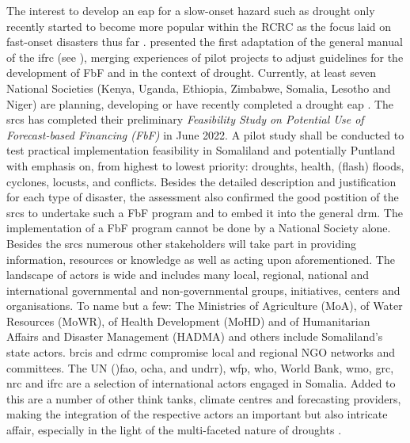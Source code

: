 The interest to develop an \acrshort{eap} for a slow-onset hazard such as drought only recently started to become more popular within the RCRC as the focus laid on fast-onset disasters thus far \autocite{rcrcFORECASTBASEDFINANCINGEARLY2020}. \autocite{rcrcFORECASTBASEDFINANCINGEARLY2020} presented the first adaptation of the general manual of the \acrshort{ifrc} (see \autocite{ifrcFbFPractitionersManual2023b}), merging experiences of pilot projects to adjust guidelines for the development of FbF and  in the context of drought. Currently, at least seven National Societies (Kenya, Uganda, Ethiopia, Zimbabwe, Somalia, Lesotho and Niger) are planning, developing or have recently completed a drought \acrshort{eap} \autocite{lesothoredcrosssocietyEARLYACTIONPROTOCOL2022,nigerredcrosssocietyNigerDroughtEarly2021,rcrcFORECASTBASEDFINANCINGEARLY2020}.\newline
The \acrfull{srcs} has completed their preliminary \textit{Feasibility Study on Potential Use of Forecast-based Financing (FbF)} in June 2022. A pilot study shall be conducted to test practical implementation feasibility in Somaliland and potentially Puntland with emphasis on, from highest to lowest priority: droughts, health, (flash) floods, cyclones, locusts, and conflicts. Besides the detailed description and justification for each type of disaster, the assessment also confirmed the good postition of the \acrshort{srcs} to undertake such a FbF program and to embed it into the general \acrlong{drm}.\newline
The implementation of a FbF program cannot be done by a National Society alone. Besides the \acrshort{srcs} numerous other stakeholders will take part in providing information, resources or knowledge as well as acting upon aforementioned. The landscape of actors is wide and includes many local, regional, national and international governmental and non-governmental groups, initiatives, centers and organisations. To name but a few: The Ministries of Agriculture (MoA), of Water Resources (MoWR), of Health Development (MoHD) and of Humanitarian Affairs and Disaster Management (HADMA) and others include Somaliland's state actors. \acrfull{brcis} and \acrfull{cdrmc} compromise local and regional NGO networks and committees. The UN ()\acrshort{fao}, \acrshort{ocha}, and \acrshort{undrr}), \acrshort{wfp}, \acrshort{who}, World Bank, \acrshort{wmo}, \acrshort{grc}, \acrshort{nrc} and \acrshort{ifrc} are a selection of international actors engaged in Somalia. Added to this are a number of other think tanks, climate centres and forecasting providers, making the integration of the respective actors an important but also intricate affair, especially in the light of the multi-faceted nature of droughts \autocite{rcrcFORECASTBASEDFINANCINGEARLY2020,scrsFeasibilityStudyPotential2022}.

